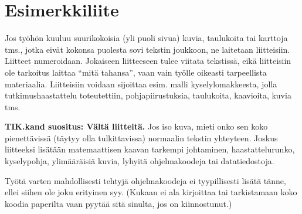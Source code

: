 \section{Esimerkkiliite}
\label{sec:app1}

Jos työhön kuuluu suurikokoisia (yli puoli sivua) kuvia, taulukoita
tai karttoja tms., jotka eivät kokonsa puolesta sovi tekstin joukkoon,
ne laitetaan liitteisiin. Liitteet numeroidaan. Jokaiseen liitteeseen
tulee viitata tekstissä, eikä liitteisiin ole tarkoitus laittaa ``mitä
tahansa'', vaan vain työlle oikeasti tarpeellista
materiaalia. Liitteisiin voidaan sijoittaa esim. malli
kyselylomakkeesta, jolla tutkimushaastattelu toteutettiin,
pohjapiirustuksia, taulukoita, kaavioita, kuvia tms.

\textbf{TIK.kand suositus: Vältä liitteitä.} Jos iso kuva, mieti onko
sen koko pienettävissä (täytyy olla tulkittavissa) normaalin tekstin
yhteyteen. Joskus liitteeksi lisätään matemaattisen kaavan tarkempi
johtaminen, haastattelurunko, kyselypohja, ylimääräisiä kuvia, lyhyitä
ohjelmakoodeja tai datatiedostoja.

Työtä varten mahdollisesti tehtyjä ohjelmakoodeja ei tyypillisesti
lisätä tänne, ellei siihen ole joku erityinen syy. (Kukaan ei ala
kirjoittaa tai tarkistamaan koko koodia paperilta vaan pyytää sitä
sinulta, jos on kiinnostunut.)

%
%
%
%

